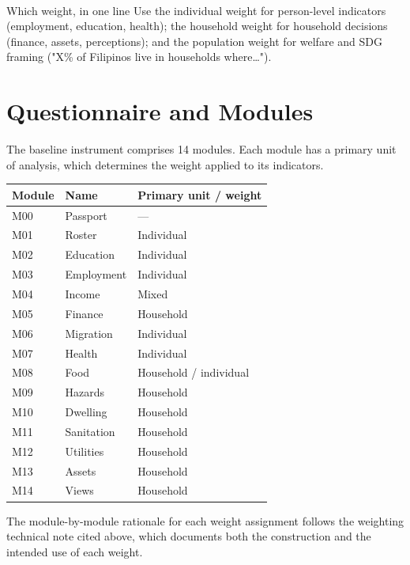\begin{refbox}
\\
\end{refbox}

\begin{notebox}{Which weight, in one line}
Use the individual weight for person-level indicators (employment, education,
health); the household weight for household decisions (finance, assets,
perceptions); and the population weight for welfare and SDG framing
("X\% of Filipinos live in households where\ldots").
\end{notebox}

\section{Questionnaire and Modules}

The baseline instrument comprises 14 modules. Each module has a primary unit of
analysis, which determines the weight applied to its indicators.

\begin{table}[h]
\centering
\small
\begin{tabular}{@{}lll@{}}
\toprule
\textbf{Module} & \textbf{Name} & \textbf{Primary unit / weight} \\
\midrule
M00 & Passport   & --- \\
M01 & Roster     & Individual \\
M02 & Education  & Individual \\
M03 & Employment & Individual \\
M04 & Income     & Mixed \\
M05 & Finance    & Household \\
M06 & Migration  & Individual \\
M07 & Health     & Individual \\
M08 & Food       & Household / individual \\
M09 & Hazards    & Household \\
M10 & Dwelling   & Household \\
M11 & Sanitation & Household \\
M12 & Utilities  & Household \\
M13 & Assets     & Household \\
M14 & Views      & Household \\
\bottomrule
\end{tabular}
\end{table}

The module-by-module rationale for each weight assignment follows the weighting
technical note cited above, which documents both the construction and the intended
use of each weight.
